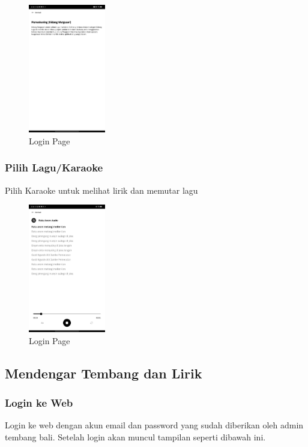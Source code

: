 \documentclass[a4paper, 12pt]{article}
\begin{document}
\begin{figure}[H]
    \centering
    \includegraphics[width=0.3\textwidth]{assets/explanation.jpg}
    \caption{Login Page}
\end{figure}

\subsubsection{Pilih Lagu/Karaoke}
Pilih Karaoke untuk melihat lirik dan memutar lagu

\begin{figure}[H]
    \centering
    \includegraphics[width=0.3\textwidth]{assets/lyric.jpg}
    \caption{Login Page}
\end{figure}

\subsection{Mendengar Tembang dan Lirik}
\subsubsection{Login ke Web}
Login ke web dengan akun email dan password yang sudah diberikan oleh admin tembang bali.
Setelah login akan muncul tampilan seperti dibawah ini.
\end{document}

